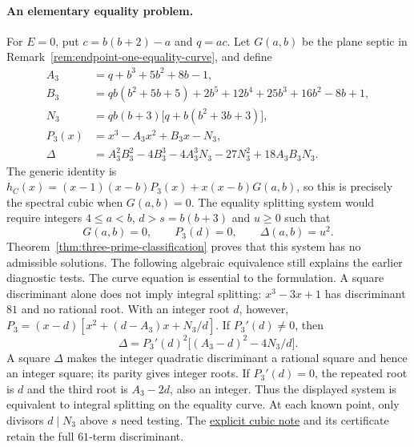 \paragraph{An elementary equality problem.}
For $E=0$, put $c=b(b+2)-a$ and $q=ac$. Let $G(a,b)$ be the plane
septic in Remark~\ref{rem:endpoint-one-equality-curve}, and define
\begin{align*}
 A_3&=q+b^3+5b^2+8b-1,\\
 B_3&=qb(b^2+5b+5)+2b^5+12b^4+25b^3+16b^2-8b+1,\\
 N_3&=qb(b+3)\bigl[q+b(b^2+3b+3)\bigr],\\
 P_3(x)&=x^3-A_3x^2+B_3x-N_3,\\
 \Delta&=A_3^2B_3^2-4B_3^3-4A_3^3N_3-27N_3^2+18A_3B_3N_3.
\end{align*}
The generic identity is
$h_C(x)=(x-1)(x-b)P_3(x)+x(x-b)G(a,b)$, so this is precisely the
spectral cubic when $G(a,b)=0$. The equality splitting system would require integers $4\leq a<b$, $d>s=b(b+3)$ and $u\geq0$ such that
\[
 G(a,b)=0,\qquad P_3(d)=0,\qquad \Delta(a,b)=u^2.
\]
Theorem~\ref{thm:three-prime-classification} proves that this system
has no admissible solutions. The following algebraic equivalence still
explains the earlier diagnostic tests. The curve equation is essential
to the formulation. A square
discriminant alone does not imply integral splitting: $x^3-3x+1$ has
discriminant $81$ and no rational root. With an integer root $d$, however,
$P_3=(x-d)[x^2+(d-A_3)x+N_3/d]$. If $P_3'(d)\ne0$, then
\[
 \Delta=P_3'(d)^2\bigl[(A_3-d)^2-4N_3/d\bigr].
\]
A square $\Delta$ makes the integer quadratic discriminant a rational
square and hence an integer square; its parity gives integer roots.
If $P_3'(d)=0$, the repeated root is $d$ and the third root is
$A_3-2d$, also an integer. Thus the displayed system is equivalent
to integral splitting on the equality curve. At each known point,
only divisors $d\mid N_3$ above $s$ need testing. The
\href{https://github.com/the-omega-institute/ideal-intersection-laplacian/blob/4afe151e1dc7193e6776cc1b08d3606aa804238e/notes/endpoint-one-equality-cubic.md}{explicit cubic note}
and its certificate retain the full $61$-term discriminant.

